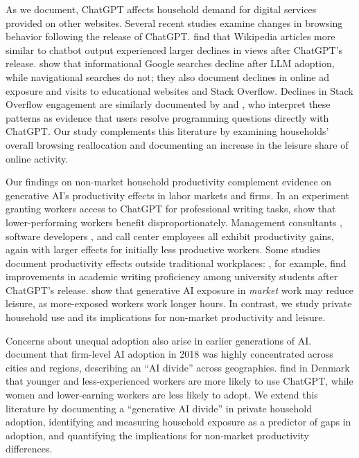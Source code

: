 \documentclass[12pt]{article}
\begin{document}
As we document, ChatGPT affects household demand for digital services provided on other websites. Several recent studies examine changes in browsing behavior following the release of ChatGPT. \cite{lyu2025wikipedia} find that Wikipedia articles more similar to chatbot output experienced larger declines in views after ChatGPT’s release. \cite{padilla2025impact} show that informational Google searches decline after LLM adoption, while navigational searches do not; they also document declines in online ad exposure and visits to educational websites and Stack Overflow. Declines in Stack Overflow engagement are similarly documented by \cite{del2024large} and \cite{burtch2024consequences}, who interpret these patterns as evidence that users resolve programming questions directly with ChatGPT. Our study complements this literature by examining households’ overall browsing reallocation and documenting an increase in the leisure share of online activity.

Our findings on non-market household productivity complement evidence on generative AI’s productivity effects in labor markets and firms. In an experiment granting workers access to ChatGPT for professional writing tasks, \cite{noy2023} show that lower-performing workers benefit disproportionately. Management consultants \citep{dell2023}, software developers \citep{peng2023}, and call center employees \citep{brynjolfsson2023} all exhibit productivity gains, again with larger effects for initially less productive workers. Some studies document productivity effects outside traditional workplaces: \cite{yu2024}, for example, find improvements in academic writing proficiency among university students after ChatGPT’s release. \cite{jiang2025ai} show that generative AI exposure in \textit{market} work may reduce leisure, as more-exposed workers work longer hours. In contrast, we study private household use and its implications for non-market productivity and leisure.

Concerns about unequal adoption also arise in earlier generations of AI. \cite{mcelheran2024} document that firm-level AI adoption in 2018 was highly concentrated across cities and regions, describing an ``AI divide'' across geographies. \cite{humlum2025} find in Denmark that younger and less-experienced workers are more likely to use ChatGPT, while women and lower-earning workers are less likely to adopt. We extend this literature by documenting a ``generative AI divide'' in private household adoption, identifying  and measuring household exposure as a predictor of gaps in adoption, and quantifying the implications for non-market productivity differences.
\end{document}
